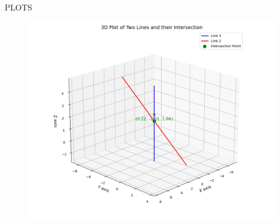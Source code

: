 \documentclass{beamer}
\begin{document}
\begin{frame}{PLOTS}
    \begin{figure}
        \centering
        \includegraphics[width=0.9\columnwidth]{figs/fig72.png}
        \caption{}
        \label{fig:placeholder}
    \end{figure}
\end{frame}
\end{document}

